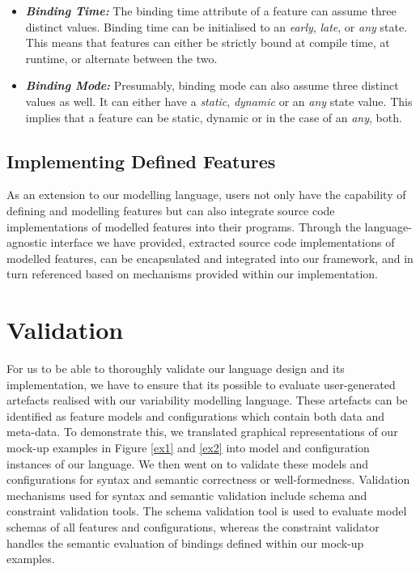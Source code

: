 \documentclass[conference]{IEEEtran}
\begin{document}
\begin{itemize}
\begin{itemize}
    \item \textit{\textbf{Binding Time:}} The binding time attribute of a feature can assume three distinct values. Binding time can be initialised to an \textit{early}, \textit{late}, or \textit{any} state. This means that features can either be strictly bound at compile time, at runtime, or alternate between the two.
    
    \item \textit{\textbf{Binding Mode:}} Presumably, binding mode can also assume three distinct values as well. It can either have a \textit{static}, \textit{dynamic} or an \textit{any} state value. This implies that a feature can be static, dynamic or in the case of an \textit{any}, both.
\end{itemize}

\end{itemize}

\subsection{Implementing Defined Features}
As an extension to our modelling language, users not only have the capability of defining and modelling features but can also integrate source code implementations of modelled features into their programs. Through the language-agnostic interface we have provided, extracted source code implementations of modelled features, can be encapsulated and integrated into our framework, and in turn referenced based on mechanisms provided within our implementation.

\section{Validation}
For us to be able to thoroughly validate our language design and its implementation, we have to ensure that its possible to evaluate user-generated artefacts realised with our variability modelling language. These artefacts can be identified as feature models and configurations which contain both data and meta-data. To demonstrate this, we translated graphical representations of our mock-up examples in Figure \ref{ex1} and \ref{ex2} into model and configuration instances of our language. We then went on to validate these models and configurations for syntax and semantic correctness or well-formedness. Validation mechanisms used for syntax and semantic validation include schema and constraint validation tools. The schema validation tool is used to evaluate model schemas of all features and configurations, whereas the constraint validator handles the semantic evaluation of bindings defined within our mock-up examples.
\end{document}

